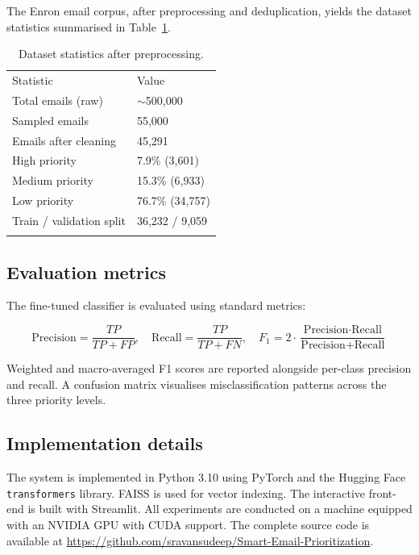 \documentclass[3p,times,procedia]{elsarticle}
\begin{document}
The Enron email corpus, after preprocessing and deduplication, yields the dataset statistics summarised in Table~\ref{tab:dataset}.

\begin{table}[h]
\caption{Dataset statistics after preprocessing.}
\label{tab:dataset}
\begin{tabular*}{\hsize}{@{\extracolsep{\fill}}ll@{}}
\toprule
Statistic & Value \\
\colrule
Total emails (raw) & $\sim$500,000 \\
Sampled emails & 55,000 \\
Emails after cleaning & 45,291 \\
High priority & 7.9\% (3,601) \\
Medium priority & 15.3\% (6,933) \\
Low priority & 76.7\% (34,757) \\
Train / validation split & 36,232 / 9,059 \\
\botrule
\end{tabular*}
\end{table}

\subsection{Evaluation metrics}

The fine-tuned classifier is evaluated using standard metrics:

\begin{equation}
\text{Precision} = \frac{TP}{TP + FP}, \quad
\text{Recall} = \frac{TP}{TP + FN}, \quad
F_1 = 2 \cdot \frac{\text{Precision} \cdot \text{Recall}}{\text{Precision} + \text{Recall}}
\label{eq:metrics}
\end{equation}

\noindent Weighted and macro-averaged F1 scores are reported alongside per-class precision and recall. A confusion matrix visualises misclassification patterns across the three priority levels.

\subsection{Implementation details}

The system is implemented in Python 3.10 using PyTorch and the Hugging Face \texttt{transformers} library. FAISS is used for vector indexing. The interactive front-end is built with Streamlit. All experiments are conducted on a machine equipped with an NVIDIA GPU with CUDA support. The complete source code is available at \url{https://github.com/sravansudeep/Smart-Email-Prioritization}.
\end{document}
